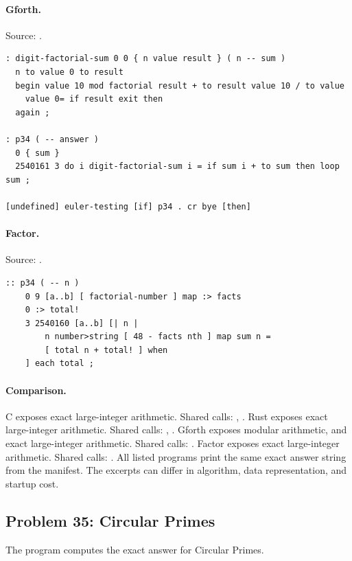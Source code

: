 \paragraph{Gforth.} Source: .
\begin{lstlisting}
: digit-factorial-sum 0 0 { n value result } ( n -- sum )
  n to value 0 to result
  begin value 10 mod factorial result + to result value 10 / to value
    value 0= if result exit then
  again ;

: p34 ( -- answer )
  0 { sum }
  2540161 3 do i digit-factorial-sum i = if sum i + to sum then loop sum ;

[undefined] euler-testing [if] p34 . cr bye [then]
\end{lstlisting}

\paragraph{Factor.} Source: .
\begin{lstlisting}
:: p34 ( -- n )
    0 9 [a..b] [ factorial-number ] map :> facts
    0 :> total!
    3 2540160 [a..b] [| n |
        n number>string [ 48 - facts nth ] map sum n =
        [ total n + total! ] when
    ] each total ;
\end{lstlisting}

\paragraph{Comparison.}
C exposes exact large-integer arithmetic. Shared calls: \texttt{}, \texttt{}. Rust exposes exact large-integer arithmetic. Shared calls: \texttt{}, \texttt{}. Gforth exposes modular arithmetic, and exact large-integer arithmetic. Shared calls: \texttt{}. Factor exposes exact large-integer arithmetic. Shared calls: \texttt{}.
All listed programs print the same exact answer string from the manifest. The excerpts can differ in algorithm, data representation, and startup cost.

\subsection{Problem 35: Circular Primes}
\label{walkthrough:p35}
The program computes the exact answer for Circular Primes.

